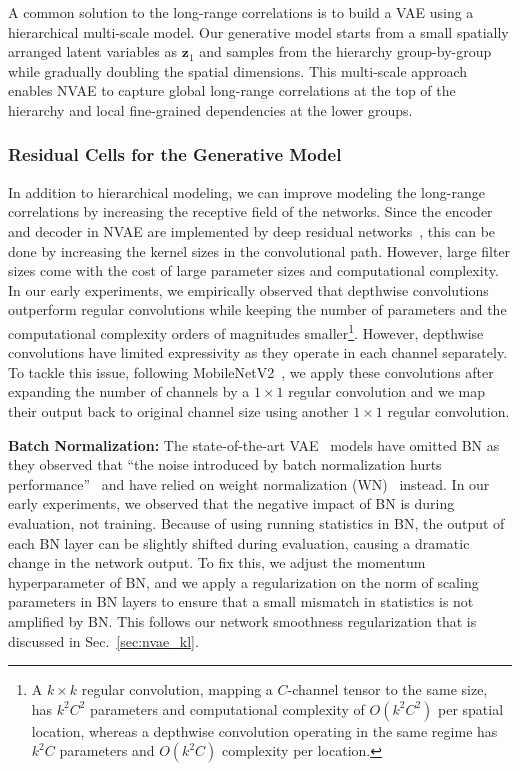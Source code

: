 \documentclass{article}
\newcommand{\z}{{\pmb{z}}}
\begin{document}
A common solution to the long-range correlations is to build a VAE using a hierarchical multi-scale model. Our generative model starts from a small spatially arranged latent variables as $\z_1$ and samples from the hierarchy group-by-group while gradually doubling the spatial dimensions. This multi-scale approach enables NVAE to capture global long-range correlations at the top of the hierarchy and local fine-grained dependencies at the lower groups.

\subsubsection{Residual Cells for the Generative Model}
In addition to hierarchical modeling, we can improve modeling the long-range correlations by increasing the receptive field of the networks. Since the encoder and decoder in NVAE are implemented by deep residual networks~\cite{he2016deep}, this can be done by increasing the kernel sizes in the convolutional path. However, large filter sizes come with the cost of large parameter sizes and computational complexity. In our early experiments, we empirically observed that depthwise convolutions outperform regular convolutions while keeping the number of parameters and the computational complexity orders of magnitudes smaller\footnote{A $k\times k$ regular convolution, mapping a $C$-channel tensor to the same size, has $k^2 C^2$ parameters and computational complexity of $O(k^2 C^2)$ per spatial location, whereas a depthwise convolution operating in the same regime has $k^2 C$ parameters and $O(k^2 C)$ complexity per location.}. However, depthwise convolutions have limited expressivity as they operate in each channel separately. To tackle this issue, following MobileNetV2~\cite{sandler2018mobilenetv2}, we apply these convolutions after expanding the number of channels by a $1\times 1$ regular convolution and we map their output back to original channel size using another $1\times 1$ regular convolution. 

\textbf{Batch Normalization:} The state-of-the-art VAE~\cite{kingma2016improved, maaloe2019biva} models have omitted BN as they observed that ``the noise introduced by batch normalization hurts performance''~\cite{kingma2016improved} and have relied on weight normalization (WN)~\cite{salimans16weight} instead. In our early experiments, we observed that the negative impact of BN is during evaluation, not training. Because of using running statistics in BN, the output of each BN layer can be slightly shifted during evaluation, causing a dramatic change in the network output. To fix this, we adjust the momentum hyperparameter of BN, and we apply a regularization on the norm of scaling parameters in BN layers to ensure that a small mismatch in statistics is not amplified by BN. This follows our network smoothness regularization that is discussed in Sec.~\ref{sec:nvae_kl}.
\end{document}

